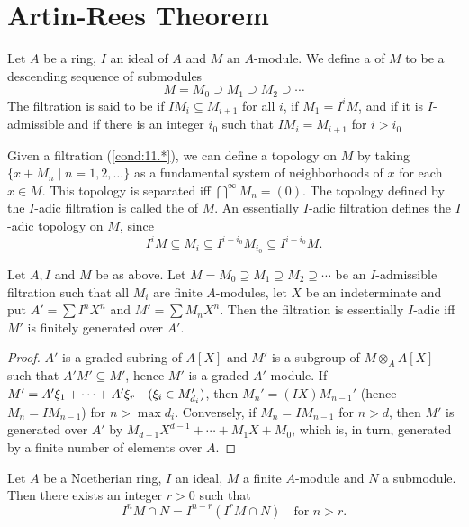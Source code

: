 \documentclass[../main]{subfiles}
\begin{document}
\section{Artin-Rees Theorem}\label{sec:11}

\newparagraph Let $A$ be a ring, $I$ an ideal of $A$ and $M$ an $A$-module. We define a \label{def:filtration} of $M$ to be a descending sequence of submodules
\[\tag{11.*}\label{cond:11.*}
    M=M_0 \supseteq M_1 \supseteq M_2 \supseteq \cdots
\]
The filtration is said to be  if $IM_i \subseteq M_{i+1}$ for all $i$,  if $M_1=I^iM$, and  if it is $I$-admissible and if there is an integer $i_0$ such that $IM_i=M_{i+1}$ for $i>i_0$

Given a filtration (\ref{cond:11.*}), we can define a topology on $M$ by taking \newline $\{x+M_n \mid n=1,2, \ldots\}$ as a fundamental system of neighborhoods of $x$ for each $x \in M$. This topology is separated iff $\bigcap^{\infty} M_n=(0)$. The topology defined by the $I$-adic filtration is called the  of $M$. An essentially $I$-adic filtration defines the $I$-adic topology on $M$, since \[I^i M \subseteq M_i \subseteq I^{i-i_0}M_{i_0} \subseteq I^{i-i_0} M.\]

\begin{parlemma}\label{lem:11.01}
Let $A, I$ and $M$ be as above. Let $M=M_0 \supseteq M_1 \supseteq M_2 \supseteq \cdots$ be an $I$-admissible filtration such that all $M_i$ are finite $A$-modules, let $X$ be an indeterminate and put $A'=\sum I^n X^n$ and $M'=\sum M_n X^n$. Then the filtration is essentially $I$-adic iff $M'$ is finitely generated over $A'$.
\end{parlemma}

\begin{proof}
$A'$ is a graded subring of $A[X]$ and $M'$ is a subgroup of $M \otimes_A A[X]$ such that $A' M' \subseteq M'$, hence $M'$ is a graded $A'$-module. If \newline $M'=A' \xi_1+\cdots+A'\xi_r\for{\xi_i \in M_{d_i}'}$, then $M_n'=(IX) M_{n-1}'$ (hence $M_n=IM_{n-1}$) for $n>\max d_i$. Conversely, if $M_n=IM_{n-1}$ for $n>d$, then $M'$ is generated over $A'$ by $M_{d-1} X^{d-1}+\cdots+M_1X+M_0$, which is, in turn, generated by a finite number of elements over $A$.
\end{proof}

\begin{partheorem}\label{thm:015}
Let $A$ be a Noetherian ring, $I$ an ideal, $M$ a finite $A$-module and $N$ a submodule. Then there exists an integer $r>0$ such that \[I^n M \cap N=I^{n-r}(I^r M \cap N) \quad\text{for }n>r.\]
\end{partheorem}
\end{document}
